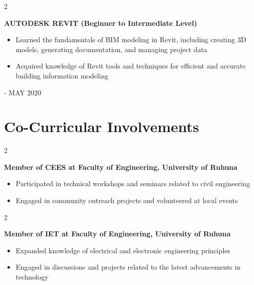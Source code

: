 \documentclass[10pt, letterpaper]{article}
\newenvironment{highlights}{
    \begin{itemize}[
        topsep=0.10 cm,
        parsep=0.10 cm,
        partopsep=0pt,
        itemsep=0pt,
        leftmargin=0.4 cm + 10pt
    ]
}{
    \end{itemize}
} %
\newenvironment{twocolentry}[2][]{
    \onecolentry
    \def\secondColumn{#2}
    \setcolumnwidth{\fill, 4.5 cm}
    \begin{paracol}{2}
    }{
    \switchcolumn \raggedleft \secondColumn
    \end{paracol}
    \endonecolentry
} %
\begin{document}
        \vspace{0.2 cm}

        \begin{twocolentry}{
            2019 - MAY 2020
        }
            \textbf{AUTODESK REVIT (Beginner to Intermediate Level)}
            \begin{highlights}
                \item  Learned the fundamentals of BIM modeling in Revit, including creating 3D models, generating documentation, and managing project data
                \item  Acquired knowledge of Revit tools and techniques for efficient and accurate building information modeling
            \end{highlights}
        \end{twocolentry}



    
    \section{Co-Curricular Involvements}



        
        \begin{twocolentry}{
        }
            \textbf{Member of CEES at Faculty of Engineering, University of Ruhuna}
            \begin{highlights}
                \item  Participated in technical workshops and seminars related to civil engineering
                \item  Engaged in community outreach projects and volunteered at local events
            \end{highlights}
        \end{twocolentry}


        \vspace{0.2 cm}

        \begin{twocolentry}{
        }
            \textbf{Member of IET at Faculty of Engineering, University of Ruhuna}
            \begin{highlights}
                \item  Expanded knowledge of electrical and electronic engineering principles
                \item  Engaged in discussions and projects related to the latest advancements in technology
            \end{highlights}
        \end{twocolentry}
\end{document}
